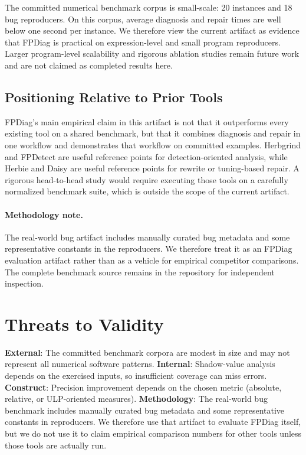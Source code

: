 \documentclass[11pt]{article}
\begin{document}
The committed numerical benchmark corpus is small-scale: 20 instances and 18
bug reproducers. On this corpus, average diagnosis and repair times are well
below one second per instance. We therefore view the current artifact as
evidence that FPDiag is practical on expression-level and small program
reproducers. Larger program-level scalability and rigorous ablation studies
remain future work and are not claimed as completed results here.

\subsection{Positioning Relative to Prior Tools}

FPDiag's main empirical claim in this artifact is not that it outperforms every
existing tool on a shared benchmark, but that it combines diagnosis and repair
in one workflow and demonstrates that workflow on committed examples. Herbgrind
and FPDetect are useful reference points for detection-oriented analysis, while
Herbie and Daisy are useful reference points for rewrite or tuning-based
repair. A rigorous head-to-head study would require executing those tools on a
carefully normalized benchmark suite, which is outside the scope of the current
artifact.

\paragraph{Methodology note.} The real-world bug artifact includes manually
curated bug metadata and some representative constants in the reproducers. We
therefore treat it as an FPDiag evaluation artifact rather than as a vehicle
for empirical competitor comparisons. The complete benchmark source remains in
the repository for independent inspection.

\section{Threats to Validity}
\textbf{External}: The committed benchmark corpora are modest in size and may
not represent all numerical software patterns. \textbf{Internal}: Shadow-value
analysis depends on the exercised inputs, so insufficient coverage can miss
errors. \textbf{Construct}: Precision improvement depends on the chosen metric
(absolute, relative, or ULP-oriented measures). \textbf{Methodology}: The
real-world bug benchmark includes manually curated bug metadata and some
representative constants in reproducers. We therefore use that artifact to
evaluate FPDiag itself, but we do not use it to claim empirical comparison
numbers for other tools unless those tools are actually run.
\end{document}
